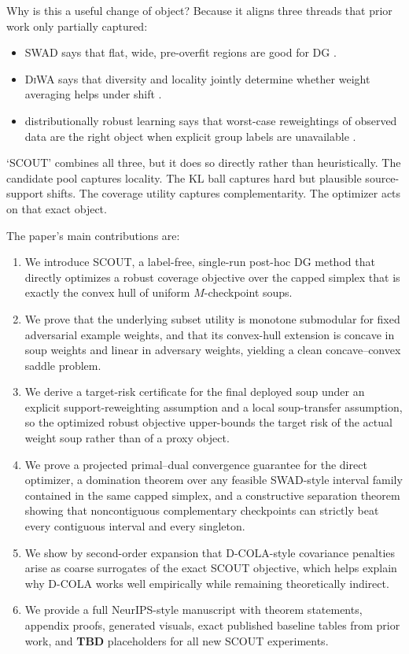 \documentclass{article}
\newcommand{\TBD}{\textbf{TBD}}
\newcommand{\scout}{\textup{\textsc{SCOUT}}}
\newcommand{\swad}{\textup{\textsc{SWAD}}}
\newcommand{\dcola}{\textup{\textsc{D-COLA}}}
\newcommand{\diwa}{\textup{\textsc{DiWA}}}
\begin{document}
Why is this a useful change of object? Because it aligns three threads that prior work only partially captured:
\begin{itemize}[leftmargin=1.4em]
    \item \swad{} says that flat, wide, pre-overfit regions are good for DG \citep{cha2021swad}.
    \item \diwa{} says that diversity and locality jointly determine whether weight averaging helps under shift \citep{rame2022diwa}.
    \item distributionally robust learning says that worst-case reweightings of observed data are the right object when explicit group labels are unavailable \citep{duchi2016fdiv,duchi2021learning}.
\end{itemize}
`SCOUT' combines all three, but it does so directly rather than heuristically. The candidate pool captures locality. The KL ball captures hard but plausible source-support shifts. The coverage utility captures complementarity. The optimizer acts on that exact object.

The paper's main contributions are:
\begin{enumerate}[leftmargin=1.4em]
    \item We introduce \scout{}, a label-free, single-run post-hoc DG method that directly optimizes a robust coverage objective over the capped simplex that is exactly the convex hull of uniform \(M\)-checkpoint soups.
    \item We prove that the underlying subset utility is monotone submodular for fixed adversarial example weights, and that its convex-hull extension is concave in soup weights and linear in adversary weights, yielding a clean concave--convex saddle problem.
    \item We derive a target-risk certificate for the final deployed soup under an explicit support-reweighting assumption and a local soup-transfer assumption, so the optimized robust objective upper-bounds the target risk of the actual weight soup rather than of a proxy object.
    \item We prove a projected primal--dual convergence guarantee for the direct optimizer, a domination theorem over any feasible \swad{}-style interval family contained in the same capped simplex, and a constructive separation theorem showing that noncontiguous complementary checkpoints can strictly beat every contiguous interval and every singleton.
    \item We show by second-order expansion that \dcola{}-style covariance penalties arise as coarse surrogates of the exact \scout{} objective, which helps explain why \dcola{} works well empirically while remaining theoretically indirect.
    \item We provide a full NeurIPS-style manuscript with theorem statements, appendix proofs, generated visuals, exact published baseline tables from prior work, and \TBD{} placeholders for all new \scout{} experiments.
\end{enumerate}
\end{document}
